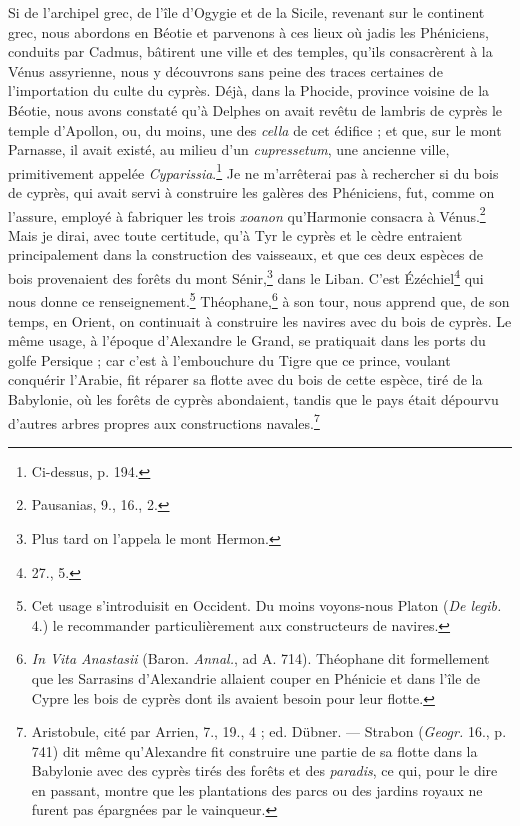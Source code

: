 \documentclass{article}
\begin{document}
Si de l'archipel grec, de l'île d'Ogygie et de la Sicile, revenant sur le continent grec, nous abordons en Béotie et parvenons à ces lieux où jadis les Phéniciens, conduits par Cadmus, bâtirent une ville et des temples, qu'ils consacrèrent à la Vénus assyrienne, nous y découvrons sans peine des traces certaines de l'importation du culte du cyprès. Déjà, dans la Phocide, province voisine de la Béotie, nous avons constaté qu'à Delphes on avait revêtu de lambris de cyprès le temple d'Apollon, ou, du moins, une des \emph{cella} de cet édifice ; et que, sur le mont Parnasse, il avait existé, au milieu d'un \emph{cupressetum}, une ancienne ville, primitivement appelée \emph{Cyparissia}.\footnote{Ci-dessus, p. 194.} Je ne m'arrêterai pas à rechercher si du bois de cyprès, qui avait servi à construire les galères des Phéniciens, fut, comme on l'assure, employé à fabriquer les trois \emph{xoanon} qu'Harmonie consacra à Vénus.\footnote{Pausanias, 9., 16., 2.} Mais je dirai, avec toute certitude, qu'à Tyr le cyprès et le cèdre entraient principalement dans la construction des vaisseaux, et que ces deux espèces de bois provenaient des forêts du mont Sénir,\footnote{Plus tard on l'appela le mont Hermon.} dans le Liban. C'est Ézéchiel\footnote{27., 5.} qui nous donne ce renseignement.\footnote{Cet usage s'introduisit en Occident. Du moins voyons-nous Platon (\emph{De legib.} 4.) le recommander particulièrement aux constructeurs de navires.} Théophane,\footnote{\emph{In Vita Anastasii} (Baron. \emph{Annal.}, ad A. 714). Théophane dit formellement que les Sarrasins d'Alexandrie allaient couper en Phénicie et dans l'île de Cypre les bois de cyprès dont ils avaient besoin pour leur flotte.} à son tour, nous apprend que, de son temps, en Orient, on continuait à construire les navires avec du bois de cyprès. Le même usage, à l'époque d'Alexandre le Grand, se pratiquait dans les ports du golfe Persique ; car c'est à l'embouchure du Tigre que ce prince, voulant conquérir l'Arabie, fit réparer sa flotte avec du bois de cette espèce, tiré de la Babylonie, où les forêts de cyprès abondaient, tandis que le pays était dépourvu d'autres arbres propres aux constructions navales.\footnote{Aristobule, cité par Arrien, 7., 19., 4 ; ed. Dübner. --- Strabon (\emph{Geogr.} 16., p. 741) dit même qu'Alexandre fit construire une partie de sa flotte dans la Babylonie avec des cyprès tirés des forêts et des \emph{paradis}, ce qui, pour le dire en passant, montre que les plantations des parcs ou des jardins royaux ne furent pas épargnées par le vainqueur.}
\end{document}
